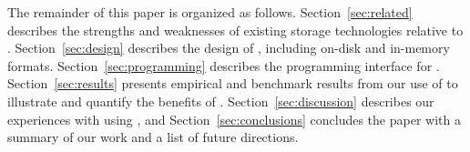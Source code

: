 The remainder of this paper is organized as follows.
Section~\ref{sec:related} describes the strengths
and weaknesses of existing storage technologies relative to \DataSeries{}. 
Section~\ref{sec:design} describes the design of \DataSeries{}, 
including on-disk and in-memory formats.
Section~\ref{sec:programming} describes the programming interface for \DataSeries{}.
Section~\ref{sec:results} 
presents empirical and benchmark results from our use of \DataSeries{}
to illustrate and quantify the benefits of
\DataSeries{}.
Section~\ref{sec:discussion} describes our experiences with using \DataSeries{}, and
Section~\ref{sec:conclusions} concludes the paper with a
summary of our work and a list of future directions.
